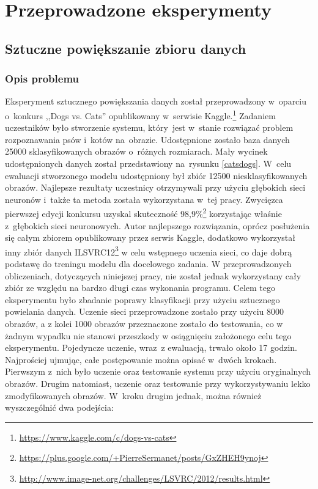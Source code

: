 \section{Przeprowadzone eksperymenty} \label{results}

\subsection{Sztuczne powiększanie zbioru danych}
\subsubsection{Opis problemu}
Eksperyment sztucznego powiększania danych został przeprowadzony w~oparciu o~konkurs ,,Dogs vs. Cats'' opublikowany w~serwisie Kaggle.\footnote{\label{myfootnote1}\url{https://www.kaggle.com/c/dogs-vs-cats}} Zadaniem uczestników było stworzenie systemu, który~jest w~stanie rozwiązać problem rozpoznawania psów i~kotów na~obrazie. Udostępnione zostało baza danych 25000 sklasyfikowanych obrazów o~różnych rozmiarach. Mały wycinek udostępnionych danych został przedstawiony na~rysunku \ref{catsdogs}. W~celu ewaluacji stworzonego modelu udostępniony był zbiór 12500 niesklasyfikowanych obrazów. Najlepsze rezultaty uczestnicy otrzymywali przy użyciu głębokich sieci neuronów i~także ta metoda została wykorzystana w~tej pracy. Zwycięzca pierwszej edycji konkursu uzyskal skuteczność 98,9\%\footnote{\label{myfootnote2}\url{https://plus.google.com/+PierreSermanet/posts/GxZHEH9ynoj}} korzystając właśnie z~głębokich sieci neuronowych. Autor najlepszego rozwiązania, oprócz posłużenia się całym zbiorem opublikowany przez serwis Kaggle, dodatkowo wykorzystał inny zbiór danych ILSVRC12\footnote{\url{http://www.image-net.org/challenges/LSVRC/2012/results.html}} w celu wstępnego uczenia sieci, co daje dobrą podstawę do treningu modelu dla docelowego zadania. W przeprowadzonych obliczeniach, dotyczących niniejszej pracy, nie został jednak wykorzystany cały zbiór ze względu na bardzo długi czas wykonania programu. Celem tego eksperymentu było zbadanie poprawy klasyfikacji przy użyciu sztucznego powielania danych. Uczenie sieci przeprowadzone zostało przy użyciu 8000 obrazów, a z kolei 1000 obrazów przeznaczone zostało do testowania, co w żadnym wypadku nie stanowi przeszkody w osiągnięciu założonego celu tego eksperymentu. Pojedyncze uczenie, wraz~z ewaluacją, trwało około 17 godzin. Najprościej ujmując, całe postępowanie można opisać w~dwóch krokach. Pierwszym z~nich było uczenie oraz testowanie systemu przy użyciu oryginalnych obrazów. Drugim natomiast, uczenie oraz testowanie przy wykorzystywaniu lekko zmodyfikowanych obrazów. W~kroku drugim jednak, można również wyszczególnić dwa podejścia:
